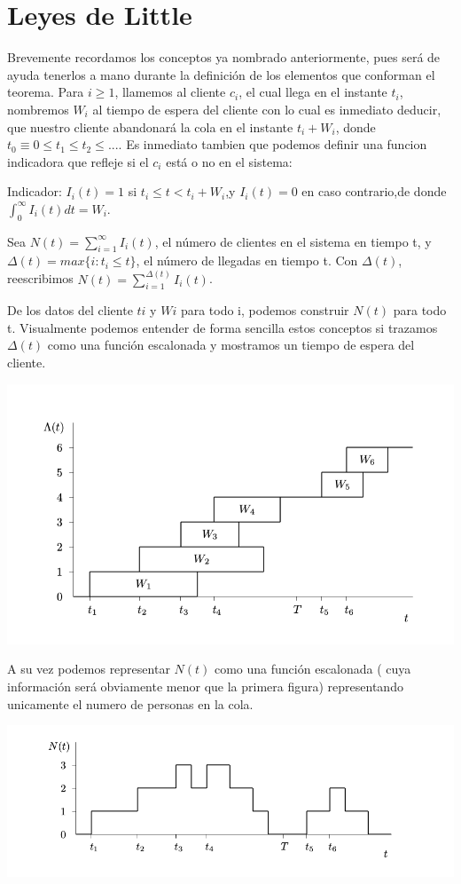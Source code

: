\documentclass[a4paper,10pt]{scrartcl}
\theoremstyle{definition}
\numberwithin{equation}{section}
\begin{document}
\section{Leyes de Little}
Brevemente recordamos los conceptos ya nombrado anteriormente, pues será de ayuda tenerlos a mano durante la definición de los elementos que conforman el teorema.
Para $i \geq 1$, llamemos al cliente $c_i$, el cual llega en el instante $t_i$, nombremos $W_i$ al tiempo de espera del cliente con lo cual es inmediato deducir, que nuestro cliente abandonará la cola en el instante $t_i + W_i$, donde $t_0 \equiv 0 \leq t_1 \leq t_2 \leq... $.
Es inmediato tambien que podemos definir una funcion indicadora que refleje si el $c_i$ está o no en el sistema:

Indicador: $I_i(t) = 1 $ si $ t_i \leq t <t_i+W_i$,y $I_i (t) = 0$ en caso contrario,de donde  $\int_{0}^{\infty} I_i(t)dt=W_i$.

Sea $N(t) = \sum_{i=1}^{\infty} I_i(t)$, el número de clientes en el sistema en tiempo t, y $\Delta (t) = max \{i: t_i \leq t\}$, el número de llegadas en tiempo t. Con $\Delta (t)$, reescribimos $N(t) = \sum_{i=1}^{\Delta (t)} I_i(t)$.

De los datos del cliente ${t i}$ y ${W i}$ para todo i, podemos construir ${N (t)}$ para
todo t. Visualmente podemos entender de forma sencilla estos conceptos si trazamos ${\Delta (t)}$ como una función escalonada y mostramos un tiempo de espera del cliente.
\begin{center}
	\includegraphics[width=\textwidth]{./imgs/fig1.png}
\end{center}
 A su vez podemos representar $N(t)$ como una función escalonada ( cuya información será obviamente menor que la primera figura) representando unicamente el numero de personas en la cola.
\begin{center}
	\includegraphics[width=\textwidth]{./imgs/fig2.png}
\end{center}
\end{document}
